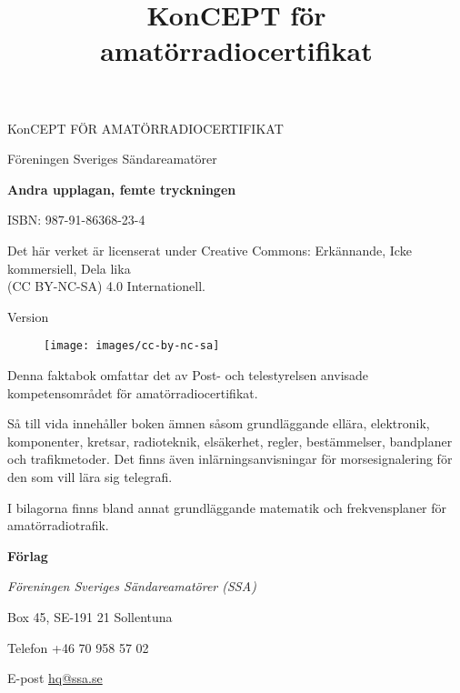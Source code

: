\onecolumn{}
\vspace{10em}
\title{KonCEPT för amatörradiocertifikat}
\begin{center}
\Large{KonCEPT FÖR AMATÖRRADIOCERTIFIKAT}

Föreningen Sveriges Sändareamatörer\\[2\baselineskip]
\end{center}

\noindent \textbf{Andra upplagan, femte tryckningen}

\noindent ISBN: 987-91-86368-23-4

\noindent
\medskip
\noindent Det här verket är licenserat under Creative Commons:\newline
\noindent Erkännande, Icke kommersiell, Dela lika\\
\noindent (CC BY-NC-SA) 4.0 Internationell.\\
\bigskip

\noindent Version \revision

\begin{figure}[h]
    \texttt{[image: images/cc-by-nc-sa]}
\end{figure}


\vfill

\noindent Denna faktabok omfattar det av Post- och tele\-styrel\-sen anvisade
kompetensområdet för amatörradiocertifikat.

\bigskip

\noindent Så till vida innehåller boken ämnen såsom grundläggande ellära, elektronik, komponenter,
kretsar, radioteknik, elsäkerhet, regler, bestämmelser, bandplaner och tra\-fik\-metoder.
Det finns även inlärningsanvisningar för morsesignalering för den
som vill lära sig telegrafi.

\bigskip

\noindent I bilagorna finns bland annat grundläggande matematik
och frekvensplaner för ama\-törradiotrafik. 

\vfill

\noindent \textbf{Förlag}

\smallskip

\noindent\textit{Föreningen Sveriges Sändareamatörer (SSA)}

\smallskip\noindent Box 45, SE-191 21 Sollentuna

\smallskip

\noindent Telefon +46 70 958 57 02


\smallskip\noindent E-post \href{mailto:hq@ssa.se}{hq@ssa.se}


\restoregeometry\twocolumn
{}
